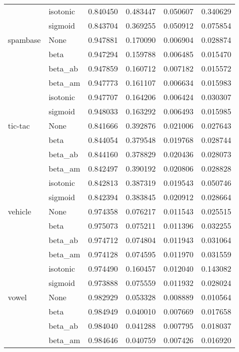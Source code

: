 \begin{tabular}{llrrrr}
        & isotonic &  0.840450 &  0.483447 &  0.050607 &  0.340629 \\
        & sigmoid &  0.843704 &  0.369255 &  0.050912 &  0.075854 \\
spambase & None &  0.947881 &  0.170090 &  0.006904 &  0.028874 \\
        & beta &  0.947294 &  0.159788 &  0.006485 &  0.015470 \\
        & beta\_ab &  0.947859 &  0.160712 &  0.007182 &  0.015572 \\
        & beta\_am &  0.947773 &  0.161107 &  0.006634 &  0.015983 \\
        & isotonic &  0.947707 &  0.164206 &  0.006424 &  0.030307 \\
        & sigmoid &  0.948033 &  0.163292 &  0.006493 &  0.015985 \\
tic-tac & None &  0.841666 &  0.392876 &  0.021006 &  0.027643 \\
        & beta &  0.844054 &  0.379548 &  0.019768 &  0.028744 \\
        & beta\_ab &  0.844160 &  0.378829 &  0.020436 &  0.028073 \\
        & beta\_am &  0.842497 &  0.390192 &  0.020806 &  0.028828 \\
        & isotonic &  0.842813 &  0.387319 &  0.019543 &  0.050746 \\
        & sigmoid &  0.842394 &  0.383845 &  0.020912 &  0.028664 \\
vehicle & None &  0.974358 &  0.076217 &  0.011543 &  0.025515 \\
        & beta &  0.975073 &  0.075211 &  0.011396 &  0.032255 \\
        & beta\_ab &  0.974712 &  0.074804 &  0.011943 &  0.031064 \\
        & beta\_am &  0.974128 &  0.074595 &  0.011970 &  0.031559 \\
        & isotonic &  0.974490 &  0.160457 &  0.012040 &  0.143082 \\
        & sigmoid &  0.973888 &  0.075559 &  0.011932 &  0.028024 \\
vowel & None &  0.982929 &  0.053328 &  0.008889 &  0.010564 \\
        & beta &  0.984949 &  0.040010 &  0.007669 &  0.017658 \\
        & beta\_ab &  0.984040 &  0.041288 &  0.007795 &  0.018037 \\
        & beta\_am &  0.984646 &  0.040759 &  0.007426 &  0.016920 \\

\end{tabular}
